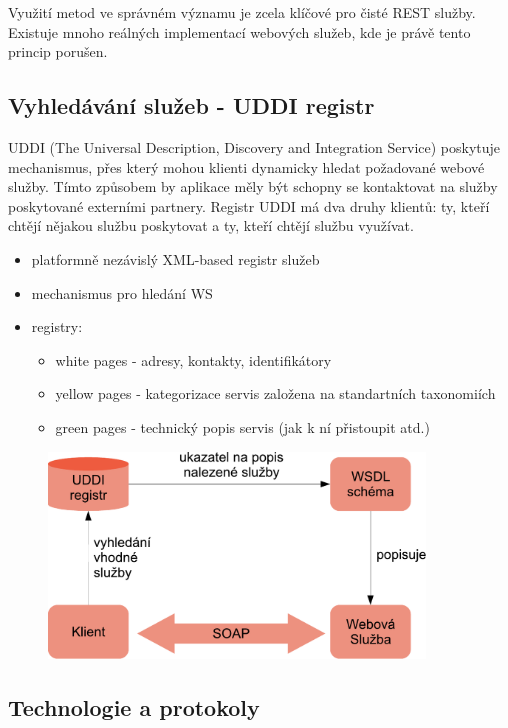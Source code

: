 Využití metod ve správném významu je zcela klíčové pro čisté REST služby. Existuje mnoho reálných implementací webových služeb, kde je právě tento princip porušen.


\subsection{Vyhledávání služeb - UDDI registr}
UDDI (The Universal Description, Discovery and Integration Service) poskytuje mechanismus, přes který mohou klienti dynamicky hledat požadované webové služby. Tímto způsobem by aplikace měly být schopny se kontaktovat na služby poskytované externími partnery. Registr UDDI má dva druhy klientů: ty, kteří chtějí nějakou službu poskytovat a ty, kteří chtějí službu využívat.

\begin{itemize}[itemsep=0px]
\item platformně nezávislý XML-based registr služeb
\item mechanismus pro hledání WS
\item registry:
\begin{itemize}[itemsep=0px]
\item white pages - adresy, kontakty, identifikátory
\item yellow pages - kategorizace servis založena na standartních taxonomiích
\item green pages - technický popis servis (jak k ní přistoupit atd.)
\end{itemize}
\end{itemize}

\begin{figure}[h!]
\centering
\includegraphics[width=100mm]{10/images/uddi}
\end{figure}

\subsection{Technologie a protokoly}
